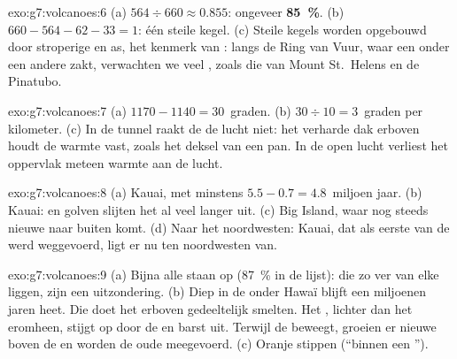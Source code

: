 \begin{solution}{exo:g7:volcanoes:6}
(a) $564 \div 660 \approx 0.855$: ongeveer \textbf{85~\%}. (b)
$660 - 564 - 62 - 33 = 1$: één steile kegel. (c) Steile kegels worden
opgebouwd door stroperige  en as, het kenmerk van : langs de Ring van Vuur, waar een  onder een andere
zakt, verwachten we veel , zoals die van Mount
St.~Helens en de Pinatubo.
\end{solution}

\begin{solution}{exo:g7:volcanoes:7}
(a) $1170 - 1140 = 30$~graden. (b) $30 \div 10 = 3$~graden per
kilometer. (c) In de tunnel raakt de  de lucht niet: het verharde dak
erboven houdt de warmte vast, zoals het deksel van een pan. In de open
lucht verliest het oppervlak meteen warmte aan de lucht.
\end{solution}

\begin{solution}{exo:g7:volcanoes:8}
(a) Kauai, met minstens $5.5 - 0.7 = 4.8$~miljoen jaar. (b) Kauai:  en
golven slijten het al veel langer uit. (c) Big Island, waar nog steeds
nieuwe  naar buiten komt. (d) Naar het noordwesten: Kauai, dat als
eerste van de  werd weggevoerd, ligt er nu ten noordwesten van.
\end{solution}

\begin{solution}{exo:g7:volcanoes:9}
(a) Bijna alle  staan op  (87~\% in de lijst):
 die zo ver van elke  liggen, zijn een uitzondering.
(b) Diep in de  onder Hawaï blijft een  miljoenen jaren heet.
Die doet het  erboven gedeeltelijk smelten. Het , lichter dan
het  eromheen, stijgt op door de  en barst uit.
Terwijl de  beweegt, groeien er nieuwe  boven de  en
worden de oude meegevoerd. (c) Oranje stippen (``binnen een '').
\end{solution}


